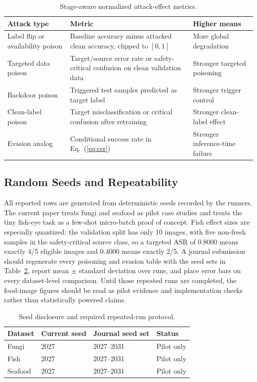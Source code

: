 \documentclass[conference]{IEEEtran}
\begin{document}
\begin{table}[t]
\centering
\caption{Stage-aware normalized attack-effect metrics.}
\label{tab:metrics}
\small
\begin{tabular}{p{}p{}p{}}
\toprule
Attack type & Metric & Higher means \\
\midrule
Label flip or availability poison & Baseline accuracy minus attacked clean accuracy, clipped to \([0,1]\) & More global degradation \\
Targeted data poison & Target/source error rate or safety-critical confusion on clean validation data & Stronger targeted poisoning \\
Backdoor poison & Triggered test samples predicted as target label & Stronger trigger control \\
Clean-label poison & Target misclassification or critical confusion after retraining & Stronger clean-label effect \\
Evasion analog & Conditional success rate in Eq.~(\ref{eq:csr}) & Stronger inference-time failure \\
\bottomrule
\end{tabular}
\end{table}

\subsection{Random Seeds and Repeatability}

All reported rows are generated from deterministic seeds recorded by the runners. The current paper treats fungi and seafood as pilot case studies and treats the tiny fish-eye task as a few-shot micro-batch proof of concept. Fish effect sizes are especially quantized: the validation split has only 10 images, with five non-fresh samples in the safety-critical source class, so a targeted ASR of 0.8000 means exactly 4/5 eligible images and 0.4000 means exactly 2/5. A journal submission should regenerate every poisoning and evasion table with the seed sets in Table~\ref{tab:seeds}, report mean \(\pm\) standard deviation over runs, and place error bars on every dataset-level comparison. Until those repeated runs are completed, the food-image figures should be read as pilot evidence and implementation checks rather than statistically powered claims.

\begin{table}[t]
\centering
\caption{Seed disclosure and required repeated-run protocol.}
\label{tab:seeds}
\small
\begin{tabular}{p{}p{}p{}p{}}
\toprule
Dataset & Current seed & Journal seed set & Status \\
\midrule
Fungi & 2027 & 2027--2031 & Pilot only \\
Fish & 2027 & 2027--2031 & Pilot only \\
Seafood & 2027 & 2027--2031 & Pilot only \\
\bottomrule
\end{tabular}
\end{table}
\end{document}
